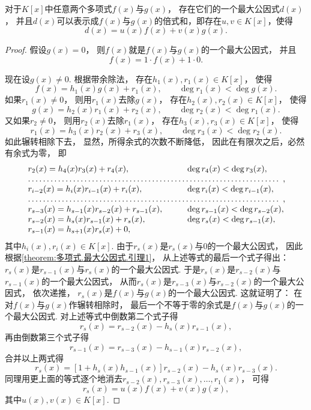 \begin{theorem}\label{theorem:多项式.辗转相除法}
对于\(K[x]\)中任意两个多项式\(f(x)\)与\(g(x)\)，
存在它们的一个最大公因式\(d(x)\)，
并且\(d(x)\)可以表示成\(f(x)\)与\(g(x)\)的倍式和，即存在\(u,v \in K[x]\)，使得\[
	d(x) = u(x) f(x) + v(x) g(x).
\]
\begin{proof}
假设\(g(x)=0\)，
则\(f(x)\)就是\(f(x)\)与\(g(x)\)的一个最大公因式，
并且\[
	f(x) = 1 \cdot f(x) + 1 \cdot 0.
\]

现在设\(g(x)\neq0\).
根据带余除法，
存在\(h_1(x),r_1(x) \in K[x]\)，
使得\[
	f(x) = h_1(x) g(x) + r_1(x), \qquad
	\deg r_1(x) < \deg g(x).
\]
如果\(r_1(x)\neq0\)，
则用\(r_1(x)\)去除\(g(x)\)，
存在\(h_2(x),r_2(x) \in K[x]\)，
使得\[
	g(x) = h_2(x) r_1(x) + r_2(x), \qquad
	\deg r_2(x) < \deg r_1(x).
\]
又如果\(r_2\neq0\)，
则用\(r_2(x)\)去除\(r_1(x)\)，
存在\(h_3(x),r_3(x) \in K[x]\)，
使得\[
	r_1(x) = h_3(x) r_2(x) + r_3(x), \qquad
	\deg r_3(x) < \deg r_2(x).
\]
如此辗转相除下去，
显然，所得余式的次数不断降低，
因此在有限次之后，必然有余式为零，
即\[\begin{array}{ll}
	r_2(x) = h_4(x) r_3(x) + r_4(x), \qquad
		&\deg r_4(x) < \deg r_3(x), \\
	\hdotsfor{2}, \\
	r_{i-2}(x) = h_i(x) r_{i-1}(x) + r_i(x), \qquad
		&\deg r_i(x) < \deg r_{i-1}(x), \\
	\hdotsfor{2}, \\
	r_{s-3}(x) = h_{s-1}(x) r_{s-2}(x) + r_{s-1}(x), \qquad
		&\deg r_{s-1}(x) < \deg r_{s-2}(x), \\
	r_{s-2}(x) = h_s(x) r_{s-1}(x) + r_s(x), \qquad
		&\deg r_s(x) < \deg r_{s-1}(x), \\
	r_{s-1}(x) = h_{s+1}(x) r_s(x) + 0,
\end{array}\]
其中\(h_i(x),r_i(x) \in K[x]\).
由于\(r_s(x)\)是\(r_s(x)\)与\(0\)的一个最大公因式，
因此根据\cref{theorem:多项式.最大公因式.引理1}，
从上述等式的最后一个式子得出：
\(r_s(x)\)是\(r_{s-1}(x)\)与\(r_s(x)\)的一个最大公因式.
于是\(r_s(x)\)是\(r_{s-2}(x)\)与\(r_{s-1}(x)\)的一个最大公因式，
从而\(r_s(x)\)是\(r_{s-3}(x)\)与\(r_{s-2}(x)\)的一个最大公因式，
依次递推，
\(r_s(x)\)是\(f(x)\)与\(g(x)\)的一个最大公因式.
这就证明了：
在对\(f(x)\)与\(g(x)\)作辗转相除时，
最后一个不等于零的余式是\(f(x)\)与\(g(x)\)的一个最大公因式.
对上述等式中倒数第二个式子得\[
	r_s(x) = r_{s-2}(x) - h_s(x) r_{s-1}(x),
\]
再由倒数第三个式子得\[
	r_{s-1}(x) = r_{s-3}(x) - h_{s-1}(x) r_{s-2}(x),
\]
合并以上两式得\[
	r_s(x) = [1 + h_s(x) h_{s-1}(x)] r_{s-2}(x) - h_s(x) r_{s-3}(x).
\]
同理用更上面的等式逐个地消去\(r_{s-2}(x),r_{s-3}(x),\dotsc,r_1(x)\)，
可得\[
	r_s(x) = u(x) f(x) + v(x) g(x),
\]
其中\(u(x),v(x) \in K[x]\).
\end{proof}
\end{theorem}

